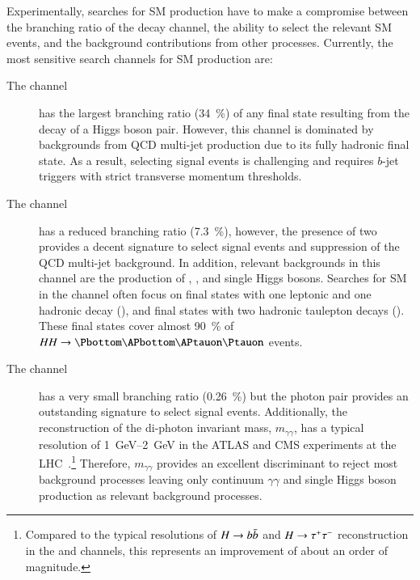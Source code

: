 Experimentally, searches for SM \HH production have to make a compromise between
the branching ratio of the decay channel, the ability to select the relevant SM
\HH events, and the background contributions from other processes. Currently,
the most sensitive search channels for SM \HH production are:
\begin{description}

\item[The \bbbb channel] has the largest branching ratio (\SI{34}{\percent}) of
  any final state resulting from the decay of a Higgs boson pair. However, this
  channel is dominated by backgrounds from QCD multi-jet production due to its
  fully hadronic final state. As a result, selecting signal events is
  challenging and requires $b$-jet triggers with strict transverse momentum
  thresholds.

\item[The \bbtautau channel] has a reduced branching ratio (\SI{7.3}{\percent}),
  however, the presence of two \tauleptons provides a decent signature to select
  signal events and suppression of the QCD multi-jet background. In addition,
  relevant backgrounds in this channel are the production of \ttbar, \Zjets, and
  single Higgs bosons. Searches for SM \HH in the \bbtautau channel often focus
  on final states with one leptonic and one hadronic \taulepton decay (\lephad),
  and final states with two hadronic taulepton decays (\hadhad). These final
  states cover almost \SI{90}{\percent} of $HH \to \bbtautau$ events.

\item[The \bbyy channel] has a very small branching ratio (\SI{0.26}{\percent})
  but the photon pair provides an outstanding signature to select signal
  events. Additionally, the reconstruction of the di-photon invariant mass,
  $m_{\gamma\gamma}$, has a typical resolution of \SIrange{1}{2}{\GeV} in the
  ATLAS and CMS experiments at the
  LHC~\cite{PERF-2007-01,CMS-CMS-00-001}.\footnote{Compared to the typical
    resolutions of $H \to b\bar{b}$ and $H \to \tau^{+} \tau^{-}$ reconstruction in the
    \bbbb and \bbtautau channels, this represents an improvement of about an
    order of magnitude.} Therefore, $m_{\gamma\gamma}$ provides an excellent
  discriminant to reject most background processes leaving only continuum
  $\gamma\gamma$ and single Higgs boson production as relevant background
  processes.

\end{description}


